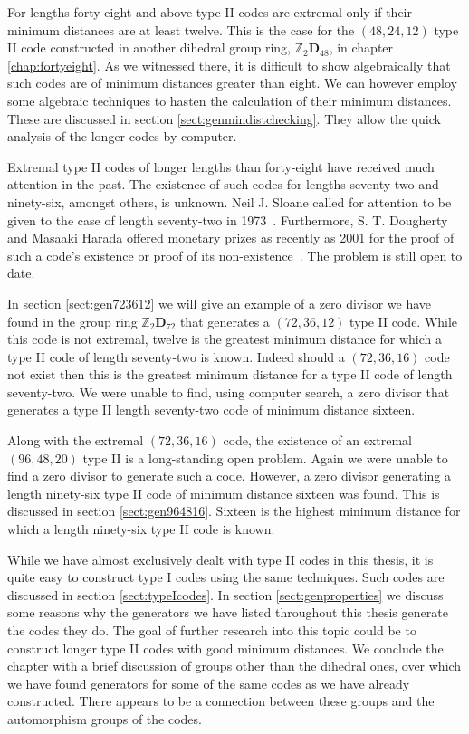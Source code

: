 For lengths forty-eight and above type II codes are extremal only if their minimum distances are at least twelve.
This is the case for the $(48,24,12)$ type II code constructed in another dihedral group ring, $\mathbb{Z}_2 \mathbf{D}_{48}$, in chapter \ref{chap:fortyeight}.
As we witnessed there, it is difficult to show algebraically that such codes are of minimum distances greater than eight.
We can however employ some algebraic techniques to hasten the calculation of their minimum distances.
These are discussed in section \ref{sect:genmindistchecking}.
They allow the quick analysis of the longer codes by computer.

Extremal type II codes of longer lengths than forty-eight have received much attention in the past.
The existence of such codes for lengths seventy-two and ninety-six, amongst others, is unknown.
Neil J. Sloane called for attention to be given to the case of length seventy-two in 1973~\cite{slo73}.
Furthermore, S. T. Dougherty and Masaaki Harada offered monetary prizes as recently as 2001 for the proof of such a code's existence or proof of its non-existence~\cite{kim08}.
The problem is still open to date.

In section \ref{sect:gen723612} we will give an example of a zero divisor we have found in the group ring $\mathbb{Z}_2 \mathbf{D}_{72}$ that generates a $(72,36,12)$ type II code.
While this code is not extremal, twelve is the greatest minimum distance for which a type II code of length seventy-two is known.
Indeed should a $(72,36,16)$ code not exist then this is the greatest minimum distance for a type II code of length seventy-two.
We were unable to find, using computer search, a zero divisor that generates a type II length seventy-two code of minimum distance sixteen.

Along with the extremal $(72,36,16)$ code, the existence of an extremal $(96,48,20)$ type II is a long-standing open problem.
Again we were unable to find a zero divisor to generate such a code.
However, a zero divisor generating a length ninety-six type II code of minimum distance sixteen was found.
This is discussed in section \ref{sect:gen964816}.
Sixteen is the highest minimum distance for which a length ninety-six type II code is known.

While we have almost exclusively dealt with type II codes in this thesis, it is quite easy to construct type I codes using the same techniques.
Such codes are discussed in section \ref{sect:typeIcodes}.
In section \ref{sect:genproperties} we discuss some reasons why the generators we have listed throughout this thesis generate the codes they do.
The goal of further research into this topic could be to construct longer type II codes with good minimum distances.
We conclude the chapter with a brief discussion of groups other than the dihedral ones, over which we have found generators for some of the same codes as we have already constructed.
There appears to be a connection between these groups and the automorphism groups of the codes.

